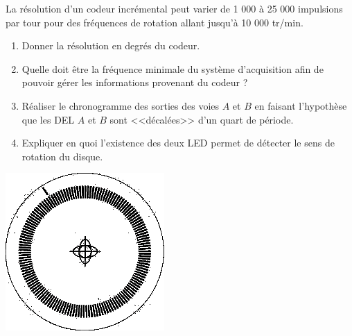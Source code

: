 \documentclass[10pt]{article}
\begin{document}
\begin{exemple}
\begin{minipage}[c]{.75\linewidth}

La résolution d'un codeur incrémental peut varier de 1 000 à 25 000 impulsions par tour pour des fréquences de rotation allant jusqu'à 10 000 tr/min.
\begin{enumerate}
\item Donner la résolution en degrés du codeur. 
\item Quelle doit être la fréquence minimale du système d'acquisition afin de pouvoir gérer les informations provenant du codeur ?
\item Réaliser le chronogramme des sorties des voies $A$ et $B$ en faisant l'hypothèse que les DEL $A$ et $B$ sont <<décalées>> d'un quart de période.
\item Expliquer en quoi l'existence des deux LED permet de détecter le sens de rotation du disque. 
\end{enumerate}
\end{minipage}\hfill
\begin{minipage}[c]{.2\linewidth}
\begin{center}
\includegraphics[width=.95\textwidth]{images/DisqueIncremental}
\end{center}
\end{minipage}


\end{exemple}
\end{document}
